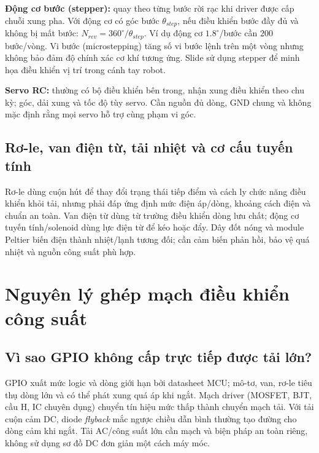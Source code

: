 \textbf{Động cơ bước (stepper):} quay theo từng bước rời rạc khi driver được cấp chuỗi xung pha. Với động cơ có góc bước $\theta_{step}$, nếu điều khiển bước đầy đủ và không bị mất bước: $N_{rev}=360^\circ/\theta_{step}$. Ví dụ động cơ $1.8^\circ$/bước cần $200$ bước/vòng. Vi bước (microstepping) tăng số vi bước lệnh trên một vòng nhưng không bảo đảm độ chính xác cơ khí tương ứng. Slide sử dụng stepper để minh họa điều khiển vị trí trong cánh tay robot.

\textbf{Servo RC:} thường có bộ điều khiển bên trong, nhận xung điều khiển theo chu kỳ; góc, dải xung và tốc độ tùy servo. Cần nguồn đủ dòng, GND chung và không mặc định rằng mọi servo hỗ trợ cùng phạm vi góc.

\subsection{Rơ-le, van điện từ, tải nhiệt và cơ cấu tuyến tính}
Rơ-le dùng cuộn hút để thay đổi trạng thái tiếp điểm và cách ly chức năng điều khiển khỏi tải, nhưng phải đáp ứng định mức điện áp/dòng, khoảng cách điện và chuẩn an toàn. Van điện từ dùng từ trường điều khiển dòng lưu chất; động cơ tuyến tính/solenoid dùng lực điện từ để kéo hoặc đẩy. Dây đốt nóng và module Peltier biến điện thành nhiệt/lạnh tương đối; cần cảm biến phản hồi, bảo vệ quá nhiệt và nguồn công suất phù hợp.

\section{Nguyên lý ghép mạch điều khiển công suất}
\subsection{Vì sao GPIO không cấp trực tiếp được tải lớn?}
GPIO xuất mức logic và dòng giới hạn bởi datasheet MCU; mô-tơ, van, rơ-le tiêu thụ dòng lớn và có thể phát xung quá áp khi ngắt. Mạch driver (MOSFET, BJT, cầu H, IC chuyên dụng) chuyển tín hiệu mức thấp thành chuyển mạch tải. Với tải cuộn cảm DC, diode \emph{flyback} mắc ngược chiều dẫn bình thường tạo đường cho dòng cảm khi ngắt. Tải AC/công suất lớn cần mạch và biện pháp an toàn riêng, không sử dụng sơ đồ DC đơn giản một cách máy móc.

